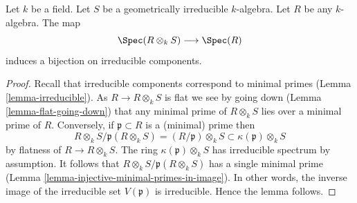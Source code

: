 \begin{lemma}
\label{lemma-geometrically-irreducible-any-base-change}
Let $k$ be a field.
Let $S$ be a geometrically irreducible $k$-algebra.
Let $R$ be any $k$-algebra.
The map
$$
\Spec(R \otimes_k S) \longrightarrow \Spec(R)
$$
induces a bijection on irreducible components.
\end{lemma}

\begin{proof}
Recall that irreducible components correspond to minimal primes
(Lemma \ref{lemma-irreducible}).
As $R \to R \otimes_k S$ is flat we see by going down
(Lemma \ref{lemma-flat-going-down}) that
any minimal prime of $R \otimes_k S$ lies over a minimal prime of $R$.
Conversely, if $\mathfrak p \subset R$ is a (minimal) prime then
$$
R \otimes_k S/\mathfrak p(R \otimes_k S)
=
(R/\mathfrak p) \otimes_k S
\subset
\kappa(\mathfrak p) \otimes_k S
$$
by flatness of $R \to R \otimes_k S$. The ring
$\kappa(\mathfrak p) \otimes_k S$ has irreducible spectrum
by assumption. It follows that
$R \otimes_k S/\mathfrak p(R \otimes_k S)$ has a single minimal
prime (Lemma \ref{lemma-injective-minimal-primes-in-image}).
In other words, the inverse image of the irreducible set
$V(\mathfrak p)$ is irreducible.
Hence the lemma follows.
\end{proof}